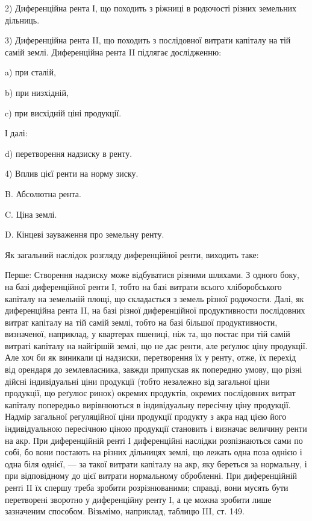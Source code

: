 \parcont{}  %
2) Диференційна рента І, що походить з ріжниці в родючості різних земельних
дільниць.

3) Диференційна рента II, що походить з послідовної витрати капіталу
на тій самій землі. Диференційна рента II підлягає дослідженню:

a) при сталій,

b) при низхідній,

c) при висхідній ціні продукції.

І далі:

d) перетворення надзиску в ренту.

4) Вплив цієї ренти на норму зиску.

B. Абсолютна рента.

C. Ціна землі.

D. Кінцеві зауваження про земельну ренту.

Як загальний наслідок розгляду диференційної ренти, виходить таке:

Перше: Створення надзиску може відбуватися різними шляхами. З одного
боку, на базі диференційної ренти І, тобто на базі витрати всього
хліборобського капіталу на земельній площі, що складається з земель різної
родючости. Далі, як диференційна рента II, на базі різної диференційної продуктивности
послідовних витрат капіталу на тій самій землі, тобто на базі
більшої продуктивности, визначеної, наприклад, у квартерах пшениці, ніж та,
що постає при тій самій витраті капіталу на найгіршій землі, що не дає ренти,
але реґулює ціну продукції. Але хоч би як виникали ці надзиски, перетворення
їх у ренту, отже, їх перехід від орендаря до землевласника, завжди припускав
як попередню умову, що різні дійсні індивідуальні ціни продукції (тобто незалежно
від загальної ціни продукції, що реґулює ринок) окремих продуктів, окремих
послідовних витрат капіталу попередньо вирівнюються в індивідуальну
пересічну ціну продукції. Надмір загальної регуляційної ціни продукції продукту
з акра над цією його індивідуальною пересічною ціною продукції становить
і визначає величину ренти на акр. При диференційній ренті І диференційні
наслідки розпізнаються сами по собі, бо вони постають на різних дільницях
землі, що лежать одна поза однією і одна біля однієї, — за такої витрати капіталу
на акр, яку береться за нормальну, і при відповідному до цієї витрати
нормальному обробленні. При диференційній ренті II їх спершу треба зробити
розрізнюваними; справді, вони мусять бути перетворені зворотно у диференційну
ренту І, а це можна зробити лише зазначеним способом. Візьмімо, наприклад,
таблицю III, ст. 149.

